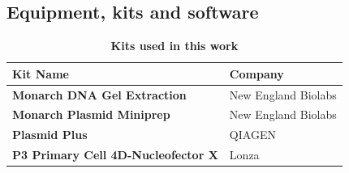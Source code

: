 \subsection{Equipment, kits and software}
\begin{table}[H]
        \caption{\textbf{Kits used in this work}}
        \label{tab:kits_list}
        \begin{tabular}{|Y{9cm}|Y{5.6cm}|}
            \hline
                \textbf{Kit Name} &  \textbf{Company} \\ 
            \hline
                \textbf{Monarch DNA Gel Extraction} & New England Biolabs \\
                \textbf{Monarch Plasmid Miniprep} & New England Biolabs \\
                \textbf{Plasmid Plus}  &   QIAGEN \\
                \textbf{P3 Primary Cell 4D-Nucleofector X} & Lonza \\
            \hline
        \end{tabular}   
    \end{table}
